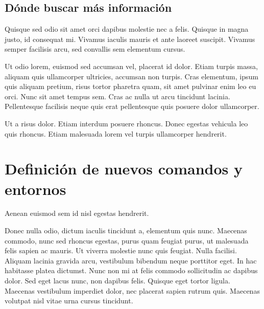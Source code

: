 \documentclass[12pt,a4paper]{report}
\begin{document}
\section{Dónde buscar más información}
\label{seccion.buscarmas}



Quisque sed odio sit amet orci dapibus molestie nec a felis. Quisque in magna justo, id consequat mi. Vivamus iaculis mauris et ante laoreet suscipit. Vivamus semper facilisis arcu, sed convallis sem elementum cursus. 

Ut odio lorem, euismod sed accumsan vel, placerat id dolor. Etiam turpis massa, aliquam quis ullamcorper ultricies, accumsan non turpis. Cras elementum, ipsum quis aliquam pretium, risus tortor pharetra quam, sit amet pulvinar enim leo eu orci. Nunc sit amet tempus sem. Cras ac nulla ut arcu tincidunt lacinia. Pellentesque facilisis neque quis erat pellentesque quis posuere dolor ullamcorper. 

Ut a risus dolor. Etiam interdum posuere rhoncus. Donec egestas vehicula leo quis rhoncus. Etiam malesuada lorem vel turpis ullamcorper hendrerit.






\chapter{Definición de nuevos comandos y entornos}
\label{tema.nuevoscomandos}



Aenean euismod sem id nisl egestas hendrerit.

Donec nulla odio, dictum iaculis tincidunt a, elementum quis nunc. Maecenas commodo, nunc sed rhoncus egestas, purus quam feugiat purus, ut malesuada felis sapien ac mauris. Ut viverra molestie nunc quis feugiat. Nulla facilisi. Aliquam lacinia gravida arcu, vestibulum bibendum neque porttitor eget. In hac habitasse platea dictumst. Nunc non mi at felis commodo sollicitudin ac dapibus dolor. Sed eget lacus nunc, non dapibus felis. Quisque eget tortor ligula. Maecenas vestibulum imperdiet dolor, nec placerat sapien rutrum quis. Maecenas volutpat nisl vitae urna cursus tincidunt. 
\end{document}
